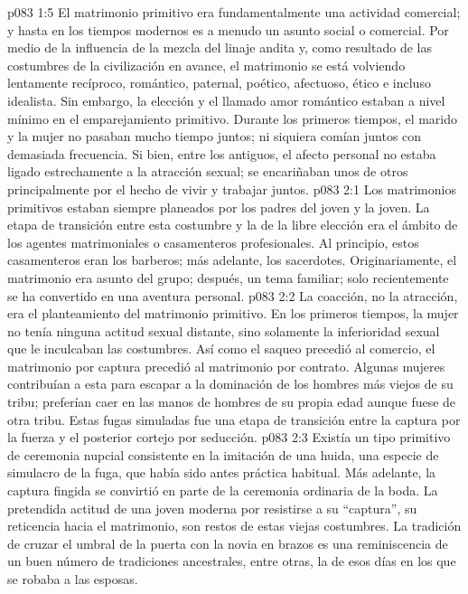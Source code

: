 \vs p083 1:5 El matrimonio primitivo era fundamentalmente una actividad comercial; y hasta en los tiempos modernos es a menudo un asunto social o comercial. Por medio de la influencia de la mezcla del linaje andita y, como resultado de las costumbres de la civilización en avance, el matrimonio se está volviendo lentamente recíproco, romántico, paternal, poético, afectuoso, ético e incluso idealista. Sin embargo, la elección y el llamado amor romántico estaban a nivel mínimo en el emparejamiento primitivo. Durante los primeros tiempos, el marido y la mujer no pasaban mucho tiempo juntos; ni siquiera comían juntos con demasiada frecuencia. Si bien, entre los antiguos, el afecto personal no estaba ligado estrechamente a la atracción sexual; se encariñaban unos de otros principalmente por el hecho de vivir y trabajar juntos.
\vs p083 2:1 Los matrimonios primitivos estaban siempre planeados por los padres del joven y la joven. La etapa de transición entre esta costumbre y la de la libre elección era el ámbito de los agentes matrimoniales o casamenteros profesionales. Al principio, estos casamenteros eran los barberos; más adelante, los sacerdotes. Originariamente, el matrimonio era asunto del grupo; después, un tema familiar; solo recientemente se ha convertido en una aventura personal.
\vs p083 2:2 La coacción, no la atracción, era el planteamiento del matrimonio primitivo. En los primeros tiempos, la mujer no tenía ninguna actitud sexual distante, sino solamente la inferioridad sexual que le inculcaban las costumbres. Así como el saqueo precedió al comercio, el matrimonio por captura precedió al matrimonio por contrato. Algunas mujeres contribuían a esta para escapar a la dominación de los hombres más viejos de su tribu; preferían caer en las manos de hombres de su propia edad aunque fuese de otra tribu. Estas fugas simuladas fue una etapa de transición entre la captura por la fuerza y el posterior cortejo por seducción.
\vs p083 2:3 Existía un tipo primitivo de ceremonia nupcial consistente en la imitación de una huida, una especie de simulacro de la fuga, que había sido antes práctica habitual. Más adelante, la captura fingida se convirtió en parte de la ceremonia ordinaria de la boda. La pretendida actitud de una joven moderna por resistirse a su “captura”, su reticencia hacia el matrimonio, son restos de estas viejas costumbres. La tradición de cruzar el umbral de la puerta con la novia en brazos es una reminiscencia de un buen número de tradiciones ancestrales, entre otras, la de esos días en los que se robaba a las esposas.
